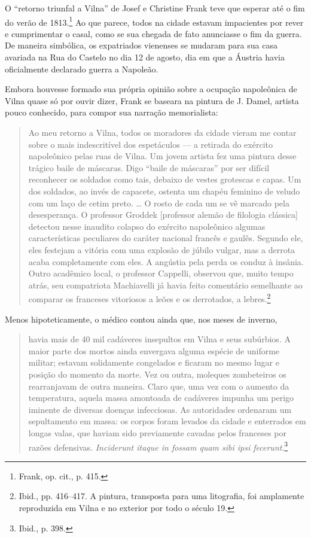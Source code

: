 \asterisc

O ``retorno triunfal a Vilna'' de Josef e Christine Frank teve que
esperar até o fim do verão de 1813.\footnote{Frank, op. cit., p. 415.}
Ao que parece, todos na cidade estavam impacientes por rever e
cumprimentar o casal, como se sua chegada de fato anunciasse o fim da
guerra. De maneira simbólica, os expatriados vienenses se mudaram para
sua casa avariada na Rua do Castelo no dia 12 de agosto, dia em que a
Áustria havia oficialmente declarado guerra a Napoleão.

Embora houvesse formado sua própria opinião sobre a ocupação napoleônica
de Vilna quase só por ouvir dizer, Frank se baseara na pintura de J.
Damel, artista pouco conhecido, para compor sua narração memorialista:

\begin{quote}
Ao meu retorno a Vilna, todos os moradores da cidade vieram me contar
sobre o mais indescritível dos espetáculos --- a retirada do exército
napoleônico pelas ruas de Vilna. Um jovem artista fez uma pintura desse
trágico baile de máscaras. Digo ``baile de máscaras'' por ser difícil
reconhecer os soldados como tais, debaixo de vestes grotescas e capas.
Um dos soldados, ao invés de capacete, ostenta um chapéu feminino de
veludo com um laço de cetim preto. \ldots{} O rosto de cada um se vê
marcado pela desesperança. O professor Groddek {[}professor alemão de
filologia clássica{]} detectou nesse inaudito colapso do exército
napoleônico algumas características peculiares do caráter nacional
francês e gaulês. Segundo ele, eles festejam a vitória com uma explosão
de júbilo vulgar, mas a derrota acaba completamente com eles. A angústia
pela perda os conduz à insânia. Outro acadêmico local, o professor
Cappelli, observou que, muito tempo atrás, seu compatriota Machiavelli
já havia feito comentário semelhante ao comparar os franceses vitoriosos
a leões e os derrotados, a lebres.\footnote{Ibid., pp. 416--417. A
  pintura, transposta para uma litografia, foi amplamente reproduzida em
  Vilna e no exterior por todo o século 19.}
\end{quote}

Menos hipoteticamente, o médico contou ainda que, nos meses de inverno,

%

\begin{quote}
havia mais de 40 mil cadáveres insepultos em Vilna e seus subúrbios. A
maior parte dos mortos ainda envergava alguma espécie de uniforme
militar; estavam solidamente congelados e ficaram no mesmo lugar e
posição do momento da morte. Vez ou outra, moleques zombeteiros os
rearranjavam de outra maneira. Claro que, uma vez com o aumento da
temperatura, aquela massa amontoada de cadáveres impunha um perigo
iminente de diversas doenças infecciosas. As autoridades ordenaram um
sepultamento em massa: os corpos foram levados da cidade e enterrados em
longas valas, que haviam sido previamente cavadas pelos franceses por
razões defensivas. \emph{Inciderunt itaque in fossam quam sibi ipsi
fecerunt}.\footnote{Ibid., p. 398.}
\end{quote}

